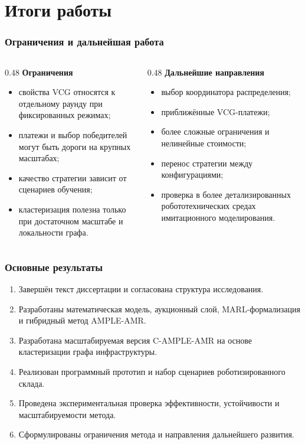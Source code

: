 \section{Итоги работы}

\begin{frame}
	\frametitle{Ограничения и дальнейшая работа}
	\small
	\begin{columns}[T,onlytextwidth]
		\begin{column}{0.48\textwidth}
			\textbf{Ограничения}
			\begin{itemize}
				\item свойства VCG относятся к отдельному раунду при фиксированных режимах;
				\item платежи и выбор победителей могут быть дороги на крупных масштабах;
				\item качество стратегии зависит от сценариев обучения;
				\item кластеризация полезна только при достаточном масштабе и локальности графа.
			\end{itemize}
		\end{column}
		\begin{column}{0.48\textwidth}
			\textbf{Дальнейшие направления}
			\begin{itemize}
				\item выбор координатора распределения;
				\item приближённые VCG-платежи;
				\item более сложные ограничения и нелинейные стоимости;
				\item перенос стратегии между конфигурациями;
				\item проверка в более детализированных робототехнических средах имитационного моделирования.
			\end{itemize}
		\end{column}
	\end{columns}
\end{frame}

\begin{frame}
	\frametitle{Основные результаты}
	\small
	\begin{enumerate}
		\item Завершён текст диссертации и согласована структура исследования.
		\item Разработаны математическая модель, аукционный слой, MARL-формализация и гибридный метод AMPLE-AMR.
		\item Разработана масштабируемая версия C-AMPLE-AMR на основе кластеризации графа инфраструктуры.
		\item Реализован программный прототип и набор сценариев роботизированного склада.
		\item Проведена экспериментальная проверка эффективности, устойчивости и масштабируемости метода.
		\item Сформулированы ограничения метода и направления дальнейшего развития.
	\end{enumerate}
\end{frame}

